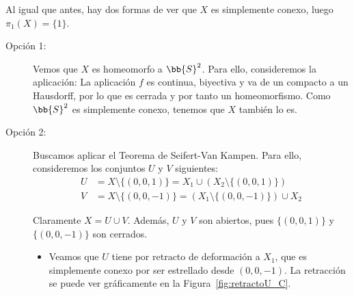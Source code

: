 \begin{ejercicio}
\begin{enumerate}[label=\alph*)]
            Al igual que antes, hay dos formas de ver que $X$ es simplemente conexo, luego $\pi_1(X)=\{1\}$.
            \begin{description}
                \item[Opción 1:] Vemos que $X$ es homeomorfo a $\bb{S}^2$. Para ello, consideremos la aplicación:
                La aplicación $f$ es continua, biyectiva y va de un compacto a un Hausdorff, por lo que es cerrada y por tanto un homeomorfismo. Como $\bb{S}^2$ es simplemente conexo, tenemos que $X$ también lo es.
                \item[Opción 2:] Buscamos aplicar el Teorema de Seifert-Van Kampen. Para ello, consideremos los conjuntos $U$ y $V$ siguientes:
                \begin{align*}
                    U &= X\setminus \{(0,0,1)\} = X_1 \cup (X_2\setminus \{(0,0,1)\}) \\
                    V &= X\setminus \{(0,0,-1)\} = (X_1\setminus \{(0,0,-1)\}) \cup X_2
                \end{align*}
                
                Claramente $X=U\cup V$. Además, $U$ y $V$ son abiertos, pues $\{(0,0,1)\}$ y $\{(0,0,-1)\}$ son cerrados.
                \begin{itemize}
                    \item Veamos que $U$ tiene por retracto de deformación a $X_1$, que es simplemente conexo por ser estrellado desde $(0,0,-1)$. La retracción se puede ver gráficamente en la Figura~\ref{fig:retractoU_C}.
                    \begin{figure}[ht]
                        \centering
\end{figure}
\end{itemize}
\end{description}
\end{enumerate}
\end{ejercicio}
